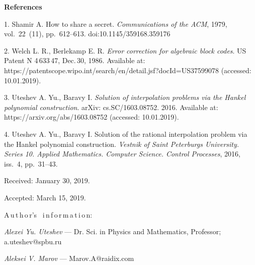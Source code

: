 
{\small

\vskip6mm

\noindent \textbf{References} }

\vskip 2mm

{\footnotesize

1. Shamir A. How to share a secret. \emph{Communications of the
ACM}, 1979, vol.~22~(11), pp.~612--613. doi:10.1145/359168.359176

2. Welch L. R., Berlekamp E. R.  {\it Error correction for
algebraic block codes}. US Patent N 4\,633\,47,\linebreak
Dec.\,30, 1986. Available at:
{https://patentscope.wipo.int/search/en/detail.jsf?docId=US37599078}
(acces\-sed: 10.01.2019).

3. Uteshev A. Yu., Baravy I. {\it Solution of interpolation
problems via the Hankel polynomial construction}. arXiv:
cs.SC/1603.08752. 2016. Available at:
{https://arxiv.org/abs/1603.08752} (acces\-sed: 10.01.2019).

4. Uteshev A. Yu., Baravy I. Solution of the rational
interpolation problem via the Hankel polynomial construction.
\emph{Vestnik of   Saint Peterburgs University. Series 10. Applied
Mathematics.  Computer Science. Control Processes}, 2016, iss.~4,
pp.~31--43.


\vskip 1.5mm

%

Received:  January 30, 2019.

Accepted: March 15, 2019.

\vskip6mm A\,u\,t\,h\,o\,r's \ i\,n\,f\,o\,r\,m\,a\,t\,i\,o\,n:

\vskip2mm\textit{Alexei Yu. Uteshev} --- Dr. Sci. in Physics and
Mathematics, Professor; a.uteshev@spbu.ru

\vskip2mm\textit{Aleksei V. Marov} --- Marov.A@raidix.com

}
